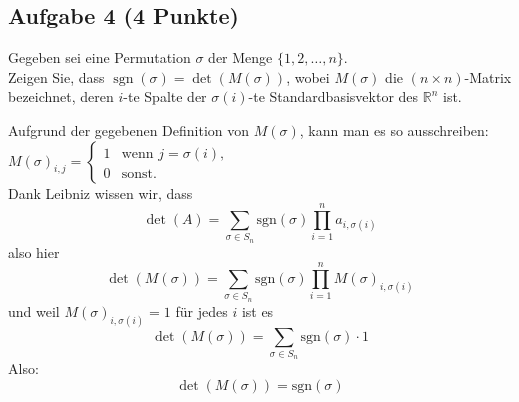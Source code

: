 \documentclass{article} %
\begin{document}
\subsection*{Aufgabe 4 (4 Punkte)} 
Gegeben sei eine Permutation $\sigma$ der Menge $\{1, 2, \dots, n\}$. \\
Zeigen Sie, dass $\operatorname{sgn}(\sigma) = \det(M(\sigma))$, wobei $M(\sigma)$ die $(n \times n)$-Matrix bezeichnet, deren $i$-te
Spalte der $\sigma(i)$-te Standardbasisvektor des $\mathbb{R}^n$ ist.
\begin{mybox}
  Aufgrund der gegebenen Definition von $M(\sigma)$, kann man es so ausschreiben: $M(\sigma)_{i,j} = 
\begin{cases} 
1 & \text{wenn } j = \sigma(i), \\
0 & \text{sonst}.
\end{cases}$ \\
Dank Leibniz wissen wir, dass 
\[
\det(A) = \sum_{\sigma \in S_n} \text{sgn}(\sigma) \prod_{i=1}^n a_{i, \sigma(i)}
\] 
also hier \[
\det(M(\sigma)) = \sum_{\sigma \in S_n} \text{sgn}(\sigma) \prod_{i=1}^n M(\sigma)_{i, \sigma(i)}
\]
und weil \( M(\sigma)_{i, \sigma(i)} = 1 \) für jedes \( i \) ist es \[
\det(M(\sigma)) = \sum_{\sigma \in S_n} \text{sgn}(\sigma) \cdot 1
\]
Also: 
\[
\det(M(\sigma)) =  \text{sgn}(\sigma) 
\]

\end{mybox}
\end{document}
